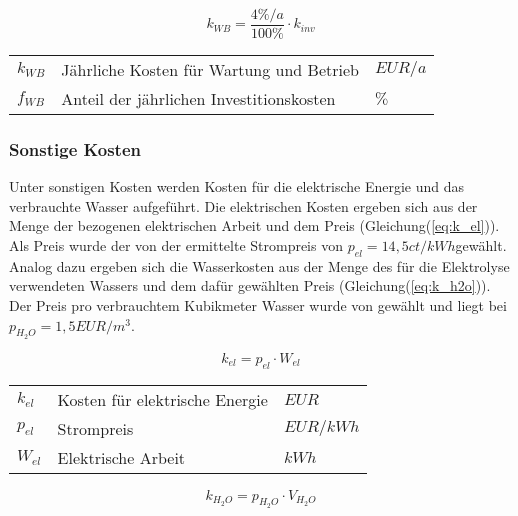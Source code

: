 \documentclass[onecolumn,10pt,titlepage]{article}
\begin{document}
				\begin{equation}
				\label{eq:k_WartBetr}
				k_{WB} = \frac{4\%/a}{100\%}\cdot k_{inv}
				\end{equation}

				\begin{table}[H]
					\begin{tabular*}{\textwidth}{lll}
						$k_{WB}$&Jährliche Kosten für Wartung und Betrieb&	$EUR/a$\\
						$f_{WB}$&	Anteil der jährlichen Investitionskosten&$\%$\\
					\end{tabular*}
				\end{table}

				\subsubsection*{Sonstige Kosten}
				Unter sonstigen Kosten werden Kosten für die elektrische Energie und das verbrauchte Wasser aufgeführt. Die elektrischen Kosten ergeben sich aus der Menge der bezogenen elektrischen Arbeit und dem Preis (Gleichung(\ref{eq:k_el})). Als Preis wurde der von der \cite{DeutscheEnergieAgenturGmbH.06.2018} ermittelte Strompreis von $p_{el} = 14,5 ct/kWh$gewählt. Analog dazu ergeben sich die Wasserkosten aus der Menge des für die Elektrolyse verwendeten Wassers und dem dafür gewählten Preis (Gleichung(\ref{eq:k_h2o})). Der Preis pro verbrauchtem Kubikmeter Wasser wurde von \cite{Hey.26.Oktober2012} gewählt und liegt bei $p_{H_2O} = 1,5 EUR/m^3$.

				\begin{equation}
				\label{eq:k_el}
				k_{el} = p_{el}\cdot W_{el}
				\end{equation}

				\begin{table}[H]
					\begin{tabular*}{\textwidth}{lll}
						$k_{el}$&Kosten für elektrische Energie&$EUR$\\
						$p_{el}$&Strompreis&$EUR/kWh$\\
						$W_{el}$&Elektrische Arbeit&$kWh$\\
					\end{tabular*}
				\end{table}

				\begin{equation}
				\label{eq:k_h2o}
				k_{H_2O} = p_{H_2O} \cdot V_{H_2O}
				\end{equation}
\end{document}
